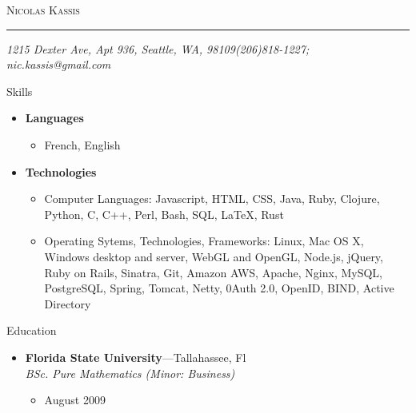 \documentclass[11pt,oneside]{article}
\makeatletter
\newcommand{\name}{Nicolas Kassis}
\newcommand{\addr}{1215 Dexter Ave, Apt 936, Seattle, WA, 98109}
\newcommand{\phone}{(206)818-1227}
\newcommand{\email}{nic.kassis@gmail.com}
\newcommand{\bigname}[1]{
  \begin{center}\fontfamily{phv}\selectfont\Huge\scshape#1\end{center}
}
\newenvironment{ressection}[1]{
  \vspace{4pt}
	 {\fontfamily{phv}\selectfont\Large#1}
	 \begin{itemize}
	   \vspace{3pt}
}{
	 \end{itemize}
}
\newcommand{\resitem}[1]{
  \vspace{-4pt}
\item \begin{flushleft} #1 \end{flushleft}
}
\newcommand{\ressubitem}[1]{
  \vspace{-1pt}
\item \begin{flushleft} #1 \end{flushleft}
}
\newcommand{\resbigitem}[3]{
  \vspace{-5pt}
\item
  \textbf{#1}---#2 \\
  \textit{#3}
}
\newenvironment{ressubsec}[3]{
  \resbigitem{#1}{#2}{#3}
  \vspace{-2pt}
  \begin{itemize}
}{
  \end{itemize}
}
\newenvironment{reslist}[1]{
  \resitem{\textbf{#1}}
  \vspace{-5pt}
  \begin{itemize}
}{
  \end{itemize}
}
\makeatother
\begin{document}
 \selectfont

\bigname{\name}
\vspace{-8pt} \rule{\textwidth}{1pt}
\vspace{-1pt} {\small\itshape \addr \hfill \phone; \email}
\vspace{8 pt}

\begin{ressection}{Skills}
  \begin{reslist}{Languages}
    \ressubitem{French, English}
   \end{reslist}
   \begin{reslist}{Technologies}
    \ressubitem{Computer Languages: Javascript, HTML, CSS, Java, Ruby, Clojure, Python, C, C++, Perl, Bash,  SQL, \LaTeX, Rust}
    \ressubitem{Operating Sytems, Technologies, Frameworks: Linux, Mac OS X, Windows desktop and server, WebGL and OpenGL,  Node.js, jQuery, Ruby on Rails, Sinatra, Git, Amazon AWS, Apache, Nginx, MySQL, PostgreSQL, Spring, Tomcat, Netty, 0Auth 2.0, OpenID, BIND, Active Directory}
    \end{reslist}
\end{ressection}

\begin{ressection}{Education}
  \begin{ressubsec}{Florida State University}{Tallahassee, Fl}{BSc. Pure Mathematics (Minor: Business)}
    \ressubitem{August 2009}
  \end{ressubsec}
\end{ressection}
\end{document}
